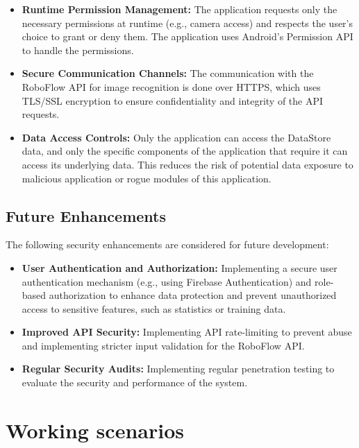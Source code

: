 \begin{itemize}
    \item \textbf{Runtime Permission Management:} The application requests only the necessary permissions at runtime (e.g., camera access) and respects the user's choice to grant or deny them. The application uses Android's Permission API to handle the permissions.
    \item \textbf{Secure Communication Channels:} The communication with the RoboFlow API for image recognition is done over HTTPS, which uses TLS/SSL encryption to ensure confidentiality and integrity of the API requests.
     \item \textbf{Data Access Controls:} Only the application can access the DataStore data, and only the specific components of the application that require it can access its underlying data. This reduces the risk of potential data exposure to malicious application or rogue modules of this application.
\end{itemize}

\subsection{Future Enhancements}

The following security enhancements are considered for future development:

\begin{itemize}
    \item \textbf{User Authentication and Authorization:}  Implementing a secure user authentication mechanism (e.g., using Firebase Authentication) and role-based authorization to enhance data protection and prevent unauthorized access to sensitive features, such as statistics or training data.
    \item \textbf{Improved API Security:} Implementing API rate-limiting to prevent abuse and implementing stricter input validation for the RoboFlow API.
     \item \textbf{Regular Security Audits:} Implementing regular penetration testing to evaluate the security and performance of the system.
\end{itemize}

\section{Working scenarios}

